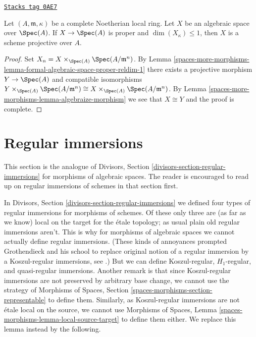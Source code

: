 \begin{lemma}
\label{spaces-more-morphisms-lemma-projective-over-complete}
\href{https://stacks.math.columbia.edu/tag/0AE7}{\texttt{Stacks tag 0AE7}}

Let $(A, \mathfrak m, \kappa)$ be a complete Noetherian local ring.
Let $X$ be an algebraic space over $\Spec(A)$.
If $X \to \Spec(A)$ is proper and $\dim(X_\kappa) \leq 1$, then
$X$ is a scheme projective over $A$.
\end{lemma}

\begin{proof}
Set $X_n = X \times_{\Spec(A)} \Spec(A/\mathfrak m^n)$.
By Lemma \ref{spaces-more-morphisms-lemma-formal-algebraic-space-proper-reldim-1}
there exists a projective morphism $Y \to \Spec(A)$
and compatible isomorphisms
$Y \times_{\Spec(A)} \Spec(A/\mathfrak m^n) \cong
X \times_{\Spec(A)} \Spec(A/\mathfrak m^n)$.
By Lemma \ref{spaces-more-morphisms-lemma-algebraize-morphism}
we see that $X \cong Y$ and the proof is complete.
\end{proof}

\section{Regular immersions}
\label{spaces-more-morphisms-section-regular-immersions}
This section is the analogue of
Divisors, Section \ref{divisors-section-regular-immersions}
for morphisms of algebraic spaces. The reader is encouraged to read up
on regular immersions of schemes in that section first.

\medskip\noindent
In
Divisors, Section \ref{divisors-section-regular-immersions}
we defined four types of regular immersions for morphisms of schemes.
Of these only three are (as far as we know) local on the target for
the \'etale topology; as usual plain old regular immersions aren't.
This is why for morphisms of algebraic spaces we cannot actually define
regular immersions. (These kinds of annoyances prompted Grothendieck
and his school to replace original notion of a regular immersion by a
Koszul-regular immersions, see
\cite[Exposee VII, Definition 1.4]{SGA6}.)
But we can define Koszul-regular, $H_1$-regular, and quasi-regular immersions.
Another remark is that since Koszul-regular immersions are not preserved by
arbitrary base change, we cannot use the strategy of
Morphisms of Spaces, Section \ref{spaces-morphisms-section-representable}
to define them. Similarly, as Koszul-regular immersions are not \'etale local
on the source, we cannot use
Morphisms of Spaces, Lemma \ref{spaces-morphisms-lemma-local-source-target}
to define them either. We replace this lemma instead by the
following.

